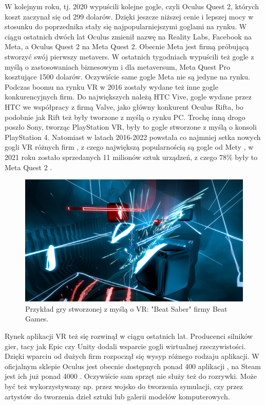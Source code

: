 \documentclass[a4paper,12pt,reqno]{article}
\begin{document}
W kolejnym roku, tj. 2020 wypuścili kolejne gogle, czyli Oculus Quest 2, których koszt zaczynał się od 299 dolarów. Dzięki jeszcze niższej cenie i lepszej mocy w stosunku do poprzednika stały się najpopularniejszymi goglami na rynku. W ciągu ostatnich dwóch lat Oculus zmienił nazwę na Reality Labs, Facebook na Meta, a Oculus Quest 2 na Meta Quest 2. Obecnie Meta jest firmą próbującą stworzyć swój pierwszy metavers. W ostatnich tygodniach wypuścili też gogle z myślą o zastosowaniach biznesowym i dla metaversum, Meta Quest Pro kosztujące 1500 dolarów. Oczywiście same gogle Meta nie są jedyne na rynku. Podczas boomu na rynku VR w 2016 zostały wydane też inne gogle konkurencyjnych firm. Do największych należą HTC Vive, gogle wydane przez HTC we współpracy z firmą Valve, jako główny konkurent Oculus Rifta, bo podobnie jak Rift też były tworzone z myślą o rynku PC. Trochę inną drogo poszło Sony, tworząc PlayStation VR, były to gogle stworzone z myślą o konsoli PlayStation 4. Natomiast w latach 2016-2022 powstała co najmniej setka nowych gogli VR różnych firm \cite{ilosc_urzadzen}, z czego największą popularnością są gogle od Mety \cite{popularnosc_gogli}, w 2021 roku zostało sprzedanych 11 milionów sztuk urządzeń, z czego 78\% były to Meta Quest 2 \cite{ilosc_urzadzen}.

\begin{figure}[!ht]%
\centering
\includegraphics[width=0.8\columnwidth]{graphics/BeatSaber.jpg}
\caption{Przykład gry stworzonej z myślą o VR: "Beat Saber" firmy Beat Games. \cite{BeatSaberpicture}
\label{BeatSaber}}%
%
\qquad
\end{figure}  


Rynek aplikacji VR też się rozwinął w ciągu ostatnich lat. Producenci silników gier, tacy jak Epic czy Unity dodali wsparcie gogli wirtualnej rzeczywistości. Dzięki wparciu od dużych firm rozpoczął się wysyp różnego rodzaju aplikacji. W oficjalnym sklepie Oculus jest obecnie dostępnych ponad 400 aplikacji \cite{liczba_gier_quest}, na Steam jest ich już ponad 4000 \cite{liczba_gier_steam}. Oczywiście sam sprzęt nie służy też do rozrywki. Może być też wykorzystywany np. przez wojsko do tworzenia symulacji, czy przez artystów do tworzenia dzieł sztuki lub galerii modelów komputerowych.
\end{document}
